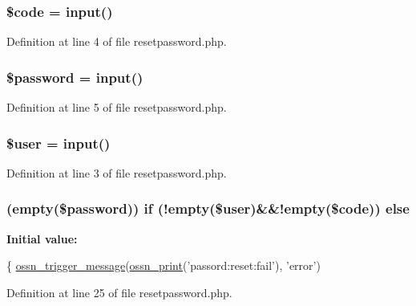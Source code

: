 \subsubsection[{\texorpdfstring{\$code}{$code}}]{\setlength{\rightskip}{0pt plus 5cm}\$code = {\bf input}(\textquotesingle{})}\hypertarget{actions_2user_2resetpassword_8php_a7949acdaecc70b9f035c12a7069db132}{}\label{actions_2user_2resetpassword_8php_a7949acdaecc70b9f035c12a7069db132}


Definition at line 4 of file resetpassword.\+php.

\subsubsection[{\texorpdfstring{\$password}{$password}}]{\setlength{\rightskip}{0pt plus 5cm}\${\bf password} = {\bf input}(\textquotesingle{})}\hypertarget{actions_2user_2resetpassword_8php_a607686ef9f99ea7c42f4f3dd3dbb2b0d}{}\label{actions_2user_2resetpassword_8php_a607686ef9f99ea7c42f4f3dd3dbb2b0d}


Definition at line 5 of file resetpassword.\+php.

\subsubsection[{\texorpdfstring{\$user}{$user}}]{\setlength{\rightskip}{0pt plus 5cm}\${\bf user} = {\bf input}(\textquotesingle{})}\hypertarget{actions_2user_2resetpassword_8php_a598ca4e71b15a1313ec95f0df1027ca5}{}\label{actions_2user_2resetpassword_8php_a598ca4e71b15a1313ec95f0df1027ca5}


Definition at line 3 of file resetpassword.\+php.

\subsubsection[{\texorpdfstring{else}{else}}]{ (empty(\${\bf password})) {\bf if} (!empty(\${\bf user})\&\&!empty(\$code)) else}\hypertarget{actions_2user_2resetpassword_8php_a7c272fa17492e9ff4bcc2b8babb0fee4}{}\label{actions_2user_2resetpassword_8php_a7c272fa17492e9ff4bcc2b8babb0fee4}
{\bfseries Initial value\+:}
\begin{DoxyCode}
\{
    \hyperlink{ossn_8lib_8system_8php_ab3f23f23f32f50c12e7aea0ffaccaac7}{ossn\_trigger\_message}(\hyperlink{ossn_8lib_8languages_8php_a2be5d1c4b695593a9b9067b96df2150a}{ossn\_print}(\textcolor{stringliteral}{'passord:reset:fail'}), \textcolor{stringliteral}{'error'})
\end{DoxyCode}


Definition at line 25 of file resetpassword.\+php.


